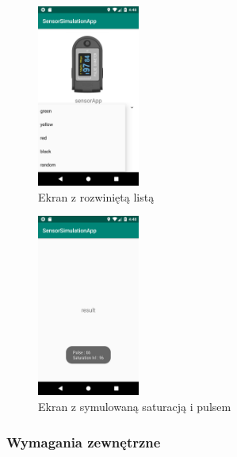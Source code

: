 \newpage
\begin{figure}[h!]
  \centering
    \includegraphics[width=0.30\textwidth]{img/scroll.png}
  \caption{Ekran z rozwiniętą listą} 
  \label{fig:org}                                       
\end{figure}
\begin{figure}[h!]
  \centering
    \includegraphics[width=0.30\textwidth]{img/result.png}
  \caption{Ekran z symulowaną saturacją i pulsem} 
  \label{fig:org}                                       
\end{figure}

\subsubsection{Wymagania zewnętrzne}

